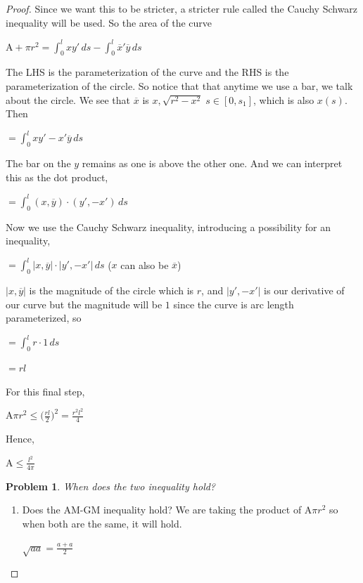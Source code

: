 \documentclass[a4paper]{book}
\newtheorem{problem}[theorem]{Problem}%
\numberwithin{theorem}{section}%
\begin{document}
\begin{proof}
    Since we want this to be stricter, a stricter rule called the Cauchy Schwarz inequality will be used. So the area of the curve
    \begin{center}
        $\displaystyle \mathrm{A}+\pi r^{2}=\int_{0}^{l}xy'\,ds-\int_{0}^{l}\overline{x}'\overline{y}\,ds$
    \end{center}
    The LHS is the parameterization of the curve and the RHS is the parameterization of the circle. So notice that that anytime we use a bar, we talk about the circle. We see that $\overline{x}$ is $x, \sqrt{r^{2}-x^{2}}\;s\in[0,s_{1}]$, which is also $x(s)$. Then
    \begin{center}
        $\displaystyle =\int_{0}^{l}xy'-x'\overline{y}\,ds$
    \end{center}
    The bar on the $y$ remains as one is above the other one. And we can interpret this as the dot product,
    \begin{center}
        $\displaystyle =\int_{0}^{l}(x,\overline{y})\cdot(y',-x')\,ds$
    \end{center}
    Now we use the Cauchy Schwarz inequality, introducing a possibility for an inequality,
    \begin{center}
        $\displaystyle =\int_{0}^{l}|x,\overline{y}|\cdot|y',-x'|\,ds$ ($x$ can also be $\overline{x}$)
    \end{center}
    $\displaystyle|x,\overline{y}|$ is the magnitude of the circle which is $r$, and $\displaystyle |y',-x'|$ is our derivative of our curve but the magnitude will be $1$ since the curve is arc length parameterized, so
    \begin{center}
        $\displaystyle =\int_{0}^{l}r\cdot1\,ds$

        $\displaystyle =rl$
    \end{center}
    For this final step,
    \begin{center}
        $\displaystyle \mathrm{A}\pi r^{2}\leq\Big(\frac{rl}{2}\Big)^{2}=\frac{r^{2}l^{2}}{4}$
    \end{center}
    Hence,
    \begin{center}
        $\displaystyle \mathrm{A}\leq\frac{l^2}{4\pi}$
    \end{center}

    \begin{problem}
        When does the two inequality hold?
    \end{problem}
    \begin{enumerate}
        \item Does the AM-GM inequality hold? We are taking the product of $\mathrm{A}\pi r^{2}$ so when both are the same, it will hold.
        \begin{center}
            $\displaystyle \sqrt{aa}=\frac{a+a}{2}$


\end{center}
\end{enumerate}
\end{proof}
\end{document}

